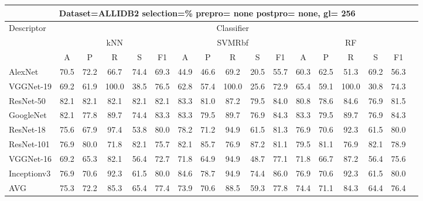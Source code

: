 \documentclass[12pt,italian]{article}
\begin{document}
\begin{tiny}
\begin{longtable}{lcccccccccccccccc}
\toprule
\multicolumn{16}{c}{Dataset=ALLIDB2 selection=\% prepro= none postpro= none, gl= 256} \\ 
\toprule
Descriptor & \multicolumn{15}{c}{Classifier} \\ 
& \multicolumn{5}{c}{kNN} & \multicolumn{5}{c}{SVMRbf} & \multicolumn{5}{c}{RF} \\ 
& A & P & R & S & F1 & A & P & R & S & F1 & A & P & R & S & F1 \\ 
\midrule
AlexNet & 70.5 & 72.2 & 66.7 & 74.4 & 69.3 & 44.9 & 46.6 & 69.2 & 20.5 & 55.7 & 60.3 & 62.5 & 51.3 & 69.2 & 56.3 \\ 
VGGNet-19 & 69.2 & 61.9 & 100.0 & 38.5 & 76.5 & 62.8 & 57.4 & 100.0 & 25.6 & 72.9 & 65.4 & 59.1 & 100.0 & 30.8 & 74.3 \\ 
ResNet-50 & 82.1 & 82.1 & 82.1 & 82.1 & 82.1 & 83.3 & 81.0 & 87.2 & 79.5 & 84.0 & 80.8 & 78.6 & 84.6 & 76.9 & 81.5 \\ 
GoogleNet & 82.1 & 77.8 & 89.7 & 74.4 & 83.3 & 83.3 & 79.5 & 89.7 & 76.9 & 84.3 & 83.3 & 79.5 & 89.7 & 76.9 & 84.3 \\ 
ResNet-18 & 75.6 & 67.9 & 97.4 & 53.8 & 80.0 & 78.2 & 71.2 & 94.9 & 61.5 & 81.3 & 76.9 & 70.6 & 92.3 & 61.5 & 80.0 \\ 
ResNet-101 & 76.9 & 80.0 & 71.8 & 82.1 & 75.7 & 82.1 & 85.7 & 76.9 & 87.2 & 81.1 & 79.5 & 81.1 & 76.9 & 82.1 & 78.9 \\ 
VGGNet-16 & 69.2 & 65.3 & 82.1 & 56.4 & 72.7 & 71.8 & 64.9 & 94.9 & 48.7 & 77.1 & 71.8 & 66.7 & 87.2 & 56.4 & 75.6 \\ 
Inceptionv3 & 76.9 & 70.6 & 92.3 & 61.5 & 80.0 & 84.6 & 78.7 & 94.9 & 74.4 & 86.0 & 76.9 & 70.6 & 92.3 & 61.5 & 80.0 \\ 
\hline
AVG & 75.3 & 72.2 & 85.3 & 65.4 & 77.4 & 73.9 & 70.6 & 88.5 & 59.3 & 77.8 & 74.4 & 71.1 & 84.3 & 64.4 & 76.4 \\ 
\hline
\bottomrule
\end{longtable} 

 \pagebreak 
\end{tiny} 
 
\end{document}
